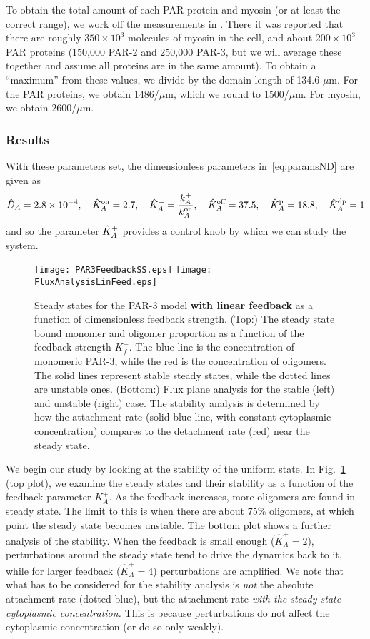 \documentclass[11pt]{article}
\newcommand{\6}[1]{#1_{\text{6}}}
\newcommand{\3}[1]{#1_{\text{3}}}
\newcommand{\A}[1]{#1_A}
\begin{document}
To obtain the total amount of each PAR protein and myosin (or at least the correct range), we work off the measurements in \cite[Fig.~S3]{gross2019guiding}. There it was reported that there are roughly $350 \times 10^3$ molecules of myosin in the cell, and about $200 \times 10^3$ PAR proteins (150,000 PAR-2 and 250,000 PAR-3, but we will average these together and assume all proteins are in the same amount). To obtain a ``maximum'' from these values, we divide by the domain length of 134.6 $\mu$m. For the PAR proteins, we obtain 1486/$\mu$m, which we round to 1500/$\mu$m. For myosin, we obtain 2600/$\mu$m.

\subsubsection{Results}
With these parameters set, the dimensionless parameters in\ \eqref{eq:paramsND} are given as
\begin{gather*}
\DhatA =2.8 \times 10^{-4}, \quad \KhatonA=2.7, \quad \KhatfA = \frac{\A{\kf}}{\A{\kon}}, \quad  \KhatoffA = 37.5, \quad \KhatpA = 18.8, \quad \KhatdpA=1
\end{gather*}
and so the parameter $\hat{K}^\text{+}_A$ provides a control knob by which we can study the system.

\begin{figure}
\centering
\texttt{[image: PAR3FeedbackSS.eps]}
\texttt{[image: FluxAnalysisLinFeed.eps]}
\caption{\label{fig:PAR3FeedSS}Steady states for the PAR-3 model \textbf{with linear feedback} as a function of dimensionless feedback strength. (Top:) The steady state bound monomer and oligomer proportion as a function of the feedback strength $K_f^+$. The blue line is the concentration of monomeric PAR-3, while the red is the concentration of oligomers. The solid lines represent stable steady states, while the dotted lines are unstable ones. (Bottom:) Flux plane analysis for the stable (left) and unstable (right) case. The stability analysis is determined by how the attachment rate (solid blue line, with constant cytoplasmic concentration) compares to the detachment rate (red) near the steady state.}
\end{figure}

We begin our study by looking at the stability of the uniform state. In Fig.\ \ref{fig:PAR3FeedSS} (top plot), we examine the steady states and their stability as a function of the feedback parameter $K_A^+$. As the feedback increases, more oligomers are found in steady state. The limit to this is when there are about 75\% oligomers, at which point the steady state becomes unstable. The bottom plot shows a further analysis of the stability. When the feedback is small enough ($\hat K_A^+=2$), perturbations around the steady state tend to drive the dynamics back to it, while for larger feedback ($\hat K_A^+=4$) perturbations are amplified. We note that what has to be considered for the stability analysis is \emph{not} the absolute attachment rate (dotted blue), but the attachment rate \emph{with the steady state cytoplasmic concentration.} This is because perturbations do not affect the cytoplasmic concentration (or do so only weakly).
\end{document}
